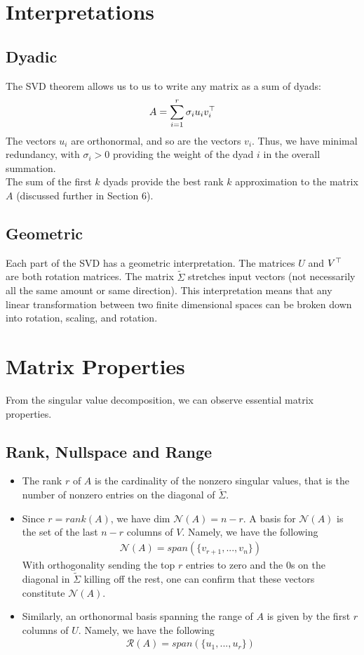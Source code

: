 \documentclass[12pt]{article}
\begin{document}
\section{Interpretations}
\subsection*{Dyadic}
The SVD theorem allows us to us to write any matrix as a sum of dyads:
\begin{gather*}
    A = \sum_{i=1}^r \sigma_i u_iv_i^\top
\end{gather*}
The vectors $u_i$ are orthonormal, and so are the vectors $v_i$. Thus, we have minimal redundancy, with $\sigma_i>0$ providing the weight of the dyad $i$ in the overall summation.\\

\noindent The sum of the first $k$ dyads provide the best rank $k$ approximation to the matrix $A$ (discussed further in Section $6$).
\subsection*{Geometric}
Each part of the SVD has a geometric interpretation. The matrices $U$ and $V^\top$ are both rotation matrices. The matrix $\tilde{\Sigma}$ stretches input vectors (not necessarily all the same amount or same direction). This interpretation means that any linear transformation between two finite dimensional spaces can be broken down into rotation, scaling, and rotation.

\section{Matrix Properties}
From the singular value decomposition, we can observe essential matrix properties.

\subsection*{Rank, Nullspace and Range}
\begin{itemize}
    \item The rank $r$ of $A$ is the cardinality of the nonzero singular values, that is the number of nonzero entries on the diagonal of $\tilde{\Sigma}$.
    \item Since $r=rank(A)$, we have dim $\mathcal{N}(A)=n - r$. A basis for $\mathcal{N}(A)$ is the set of the last $n - r$ columns of $V$. Namely, we have the following
    \begin{gather*}
        \mathcal{N}(A) = span(\lbrace v_{r+1}, ..., v_{n}\rbrace) 
    \end{gather*}
    With orthogonality sending the top $r$ entries to zero and the $0$s on the diagonal in $\tilde{\Sigma}$ killing off the rest, one can confirm that these vectors constitute $\mathcal{N}(A)$.
    \item Similarly, an orthonormal basis spanning the range of $A$ is given by the first $r$ columns of $U$. Namely, we have the following
        \begin{gather*}
        \mathcal{R}(A) = span(\lbrace u_{1}, ..., u_{r}\rbrace) 
    \end{gather*}
\end{itemize}
\end{document}
